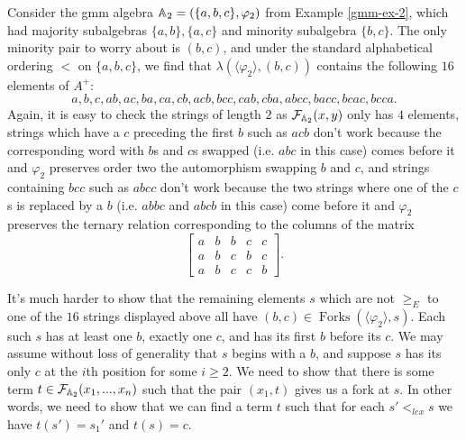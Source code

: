 \documentclass[letterpaper,11pt]{article}
\DeclareMathOperator{\Forks}{Forks}
\begin{document}
\begin{ex} Consider the gmm algebra $\mathbb{A}_2 = (\{a,b,c\},\varphi_2)$ from Example \ref{gmm-ex-2}, which had majority subalgebras $\{a,b\}, \{a,c\}$ and minority subalgebra $\{b,c\}$. The only minority pair to worry about is $(b,c)$, and under the standard alphabetical ordering $<$ on $\{a,b,c\}$, we find that $\lambda(\langle \varphi_2 \rangle, (b,c))$ contains the following $16$ elements of $A^+$:
\[
a, b, c, ab, ac, ba, ca, cb, acb, bcc, cab, cba, abcc, bacc, bcac, bcca.
\]
Again, it is easy to check the strings of length $2$ as $\mathcal{F}_{\mathbb{A}_2}(x,y)$ only has $4$ elements, strings which have a $c$ preceding the first $b$ such as $acb$ don't work because the corresponding word with $b$s and $c$s swapped (i.e. $abc$ in this case) comes before it and $\varphi_2$ preserves order two the automorphism swapping $b$ and $c$, and strings containing $bcc$ such as $abcc$ don't work because the two strings where one of the $c$s is replaced by a $b$ (i.e. $abbc$ and $abcb$ in this case) come before it and $\varphi_2$ preserves the ternary relation corresponding to the columns of the matrix
\[
\begin{bmatrix} a & b & b & c & c\\ a & b & c & b & c\\ a & b & c & c & b\end{bmatrix}.
\]

It's much harder to show that the remaining elements $s$ which are not $\ge_E$ to one of the $16$ strings displayed above all have $(b,c) \in \Forks(\langle \varphi_2 \rangle, s)$. Each such $s$ has at least one $b$, exactly one $c$, and has its first $b$ before its $c$. We may assume without loss of generality that $s$ begins with a $b$, and suppose $s$ has its only $c$ at the $i$th position for some $i \ge 2$. We need to show that there is some term $t \in \mathcal{F}_{\mathbb{A}_2}(x_1, ..., x_n)$ such that the pair $(x_1, t)$ gives us a fork at $s$. In other words, we need to show that we can find a term $t$ such that for each $s' <_{lex} s$ we have $t(s') = s_1'$ and $t(s) = c$.


\end{ex}
\end{document}
